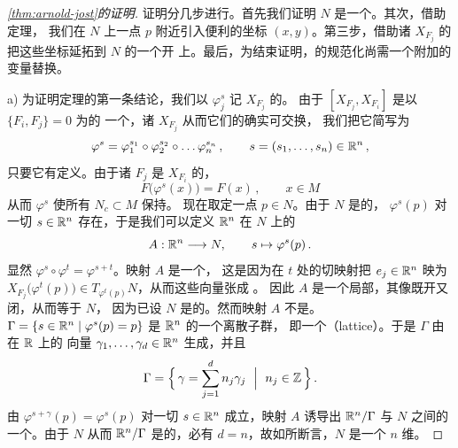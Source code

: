 \begin{proof}[\cref*{thm:arnold-jost}的证明]
证明分几步进行。首先我们证明 $N$ 是一个\trTorus。其次，借助\trLiouville{}定理，%
我们在 $N$ 上一点 $p$ 附近引入便利的坐标 $(x,y)$。第三步，借助诸%
\trHamiltonianVectorField{} $X_{F_{j}}$ 的\trFlow{}把这些坐标延拓到 $N$ 的一个开%
\trNeighborhood{}上。最后，为结束证明，\trPeriodic{}的规范化尚需一个附加的%
\trSymplectic{}变量替换。

a) 为证明定理的第一条结论，我们以 $\varphi^{s}_{j}$ 记 $X_{F_{j}}$ 的\trFlow。%
由于 $[X_{F_{j}},X_{F_{i}}]$ 是以 $\{F_{i},F_{j}\}=0$ 为\trHamiltonianFunction{}的%
一个\trHamiltonianVectorField，诸\trVectorField{} $X_{F_{j}}$ 从而它们的\trFlow{}确实可交换，%
我们把它简写为
\begin{equation}\label{eq:flow-phi-s}
\varphi^{s}=\varphi^{s_{1}}_{1}\circ\varphi^{s_{2}}_{2}\circ\dots\varphi^{s_{n}}_{n}\,,%
\qquad s=(s_{1},\dots,s_{n})\in\R^{n}\,,
\end{equation}
只要它有定义。由于诸 $F_{j}$ 是 $X_{F_{i}}$ 的\trFirstIntegral，
\[
F\bigl(\varphi^{s}(x)\bigr)=F(x)\,,\qquad x\in M
\]
从而 $\varphi^{s}$ 使所有\trLevelSet{} $N_{c}\subset M$ 保持\trInvariant。%
现在取定一点 $p\in N$。由于 $N$ 是\trCompact{}的，\trFlow{} $\varphi^{s}(p)$%
对一切 $s\in\mathbb{R}^{n}$ 存在，于是我们可以定义 $\mathbb{R}^{n}$ 在 $N$ 上的\trGroupAction
\begin{equation}\label{eq:action-A}
A:\mathbb{R}^{n}\longrightarrow N,\qquad s\mapsto\varphi^{s}(p)\,.
\end{equation}
显然 $\varphi^{s}\circ\varphi^{t}=\varphi^{s+t}$。映射 $A$ 是一个\trImmersion，%
这是因为在 $t$ 处的切映射把 $e_{j}\in\mathbb{R}^{n}$ 映为%
$X_{F_{j}}\bigl(\varphi^{t}(p)\bigr)\in T_{\varphi^{t}(p)}N$，从而这些向量张成%
\trTangentSpace。%
因此 $A$ 是一个局部\trDiffeomorphism，其像既开又闭，从而等于 $N$，%
因为已设 $N$ 是\trConnected{}的。然而映射 $A$ 不是\trInjective。\trIsotropyGroup%
$\Gamma=\{s\in\mathbb{R}^{n}\mid\varphi^{s}(p)=p\}$ 是 $\mathbb{R}^{n}$ 的一个离散子群，%
即一个\textbf{\trLattice}（lattice）。于是 $\Gamma$ 由在 $\mathbb{R}$ 上\trLinearlyIndependent{}的%
向量 $\gamma_{1},\dots,\gamma_{d}\in\mathbb{R}^{n}$ 生成，并且
\begin{equation}\label{eq:lattice-gamma}
\Gamma=\Bigl\{\,\gamma=\sum_{j=1}^{d}n_{j}\gamma_{j}\ \Bigm|\ n_{j}\in\mathbb{Z}\,\Bigr\}\,.
\end{equation}
由 $\varphi^{s+\gamma}(p)=\varphi^{s}(p)$ 对一切 $s\in\mathbb{R}^{n}$ 成立，映射 $A$%
诱导出 $\mathbb{R}^{n}/\Gamma$ 与 $N$ 之间的一个\trDiffeomorphism。由于 $N$ 从而%
$\mathbb{R}^{n}/\Gamma$ 是\trCompact{}的，必有 $d=n$，故如所断言，$N$ 是一个 $n$ 维\trTorus。


\end{proof}
